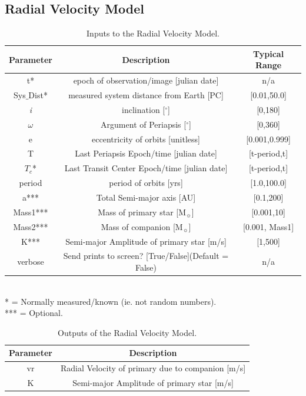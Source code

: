 \documentclass[10pt,preprint]{aastex}
\begin{document}
\subsection{Radial Velocity Model}
\begin{table}[h]
\centering
\caption{ Inputs to the Radial Velocity Model.}
\begin{tabular}{c c c}
\hline\hline
Parameter & Description & Typical Range \\
\hline
t* & epoch of observation/image [julian date] & n/a\\
Sys$\_$Dist* & measured system distance from Earth [PC] &  [0.01,50.0]\\
{\it i} & inclination [$^{\circ}$] & [0,180]\\
$\omega$ & Argument of Periapsis [$^{\circ}$] & [0,360]\\
e & eccentricity of orbits [unitless] & [0.001,0.999]\\
T & Last Periapsis Epoch/time [julian date] & [t-period,t]\\
$T_c$* & Last Transit Center Epoch/time [julian date] & [t-period,t]\\
period & period of orbits [yrs] & [1.0,100.0]\\
a*** & Total Semi-major axis [AU]  & [0.1,200] \\
Mass1*** & Mass of primary star [M$_{\sun}$] & [0.001,10] \\
Mass2*** & Mass of companion [M$_{\sun}$] & [0.001, Mass1] \\
K*** & Semi-major Amplitude of primary star [m/s]& [1,500]\\
verbose & Send prints to screen? [True/False](Default = False) & n/a\\
\hline
\end{tabular}
\\
  * = Normally measured/known (ie. not random numbers).\\
 *** = Optional.
\end{table}


\begin{table}[h]
\centering
\caption{ Outputs of the Radial Velocity Model.}
\begin{tabular}{c c}
\hline\hline
Parameter & Description \\
\hline
vr & Radial Velocity of primary due to companion [m/s] \\
K & Semi-major Amplitude of primary star [m/s]\\
\hline
\end{tabular}
\end{table}
\end{document}
